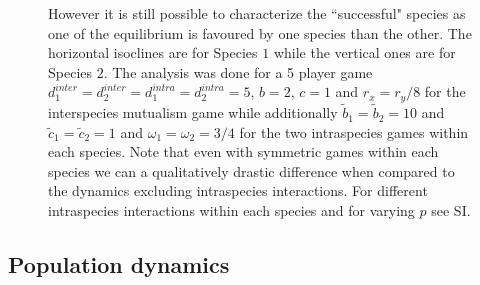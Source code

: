 \documentclass{pnastwo}
\begin{document}
\begin{article}
\begin{figure}
\begin{center}
{However it is still possible to characterize the ``successful" species as one of the equilibrium is favoured by one species than the other.
The horizontal isoclines are for Species $1$ while the vertical ones are for Species $2$.
The analysis was done for a 5 player game $d_1^{inter} = d_2^{inter} = d_1^{intra} = d_2^{intra} = 5$, $b=2$, $c=1$ and $r_x = r_y /8$ for the interspecies mutualism game while additionally $\tilde{b}_1 = \tilde{b}_2 = 10$ and $\tilde{c}_1 = \tilde{c}_2 = 1$ and $\omega_1 = \omega_2 = 3/4$ for the two intraspecies games within each species. Note that even with symmetric games within each species we can a qualitatively drastic difference when compared to the dynamics excluding intraspecies interactions.  For different intraspecies interactions within each species and for varying $p$ see SI.
\label{fig:mainexampleone}
}
\end{center}
\end{figure}

\subsection{Population dynamics}


\end{article}
\end{document}
